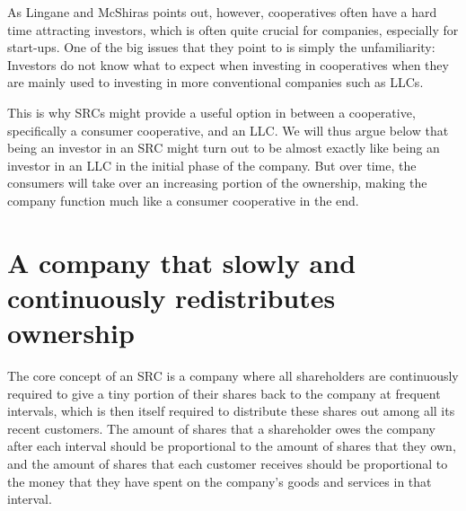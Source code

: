 \documentclass{article}
\begin{document}
As Lingane and McShiras \cite{Lingane and McShiras_2} %
points out, however, cooperatives often have a hard time attracting investors, which is often quite crucial for companies, especially for start-ups. %
One of the big issues that they point to is simply the unfamiliarity: Investors do not know what to expect when investing in cooperatives when they are mainly used to investing in more conventional companies such as LLCs. 

This is why SRCs might provide a useful option in between a cooperative, specifically a consumer cooperative, and an LLC. We will thus argue below that being an investor in an SRC might turn out to be almost exactly like being an investor in an LLC in the initial phase of the company. But over time, the consumers will take over an increasing portion of the ownership, making the company function much like a consumer cooperative in the end. 




\section{A company that slowly and continuously redistributes ownership}
\label{sect_def}


The core concept of an SRC is a company where all shareholders are continuously required to give a tiny portion of their shares back to the company at frequent intervals, which is then itself required to distribute these shares out among all its recent customers. The amount of shares that a shareholder owes the company after each interval should be proportional to the amount of shares that they own, and the amount of shares that each customer receives should be proportional to the money that they have spent on the company's goods and services in that interval. 

\end{document}
